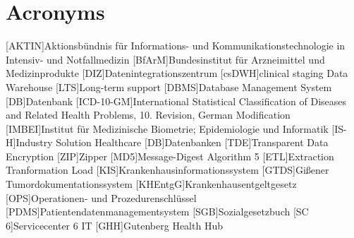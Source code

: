 \chapter*{Acronyms}
    \begin{acronym}[CDW]
    	[AKTIN]{Aktionsbündnis für Informations- und Kommunikationstechnologie in Intensiv- und Notfallmedizin}
    	[BfArM]{Bundesinstitut für Arzneimittel und Medizinprodukte}
    	[DIZ]{Datenintegrationszentrum}
    	[csDWH]{clinical staging Data Warehouse}
    	[LTS]{Long-term support}
    	[DBMS]{Database Management System}
    	[DB]{Datenbank}
    	[ICD-10-GM]{International Statistical Classification of Diseases and Related Health
    		Problems, 10. Revision, German Modification}
    	[IMBEI]{Institut für Medizinische Biometrie; Epidemiologie und Informatik}
    	[IS-H]{Industry Solution Healthcare}
    	[DB]{Datenbanken}
    	[TDE]{Transparent Data Encryption}
    	[ZIP]{Zipper}
    	[MD5]{Message-Digest Algorithm 5}    	
    	[ETL]{Extraction Tranformation Load}
    	[KIS]{Krankenhausinformationssystem}
    	[GTDS]{Gißener Tumordokumentationssystem}
    	[KHEntgG]{Krankenhausentgeltgesetz}
    	[OPS]{Operationen- und Prozedurenschlüssel}
    	[PDMS]{Patientendatenmanagementsystem}
    	[SGB]{Sozialgesetzbuch}
    	[SC 6]{Servicecenter 6 IT}
    	[GHH]{Gutenberg Health Hub}
    \end{acronym}